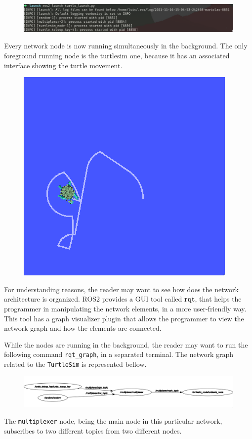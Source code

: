 \begin{figure}[H]
        \centering
         \includegraphics[width=0.7\linewidth]{images/ts_launch_ros.png}
\end{figure}

Every network node is now running simultaneously in the background. The only foreground running node is the turtlesim one, because it has an associated interface showing the turtle movement.

\begin{figure}[H]
        \centering
        \includegraphics[width=0.3\linewidth]{images/ts_turtle.png}
\end{figure}

For understanding reasons, the reader may want to see how does the network architecture is organized. ROS2 provides a GUI tool called \textbf{rqt}, that helps the programmer in manipulating the network elements, in a more user-friendly way. This tool has a graph visualizer plugin that allows the programmer to view the network graph and how the elements are connected.

While the nodes are running in the background, the reader may want to run the following command \texttt{rqt\_graph}, in a separated terminal. The network graph related to the \texttt{TurtleSim} is represented bellow.

\begin{figure}[H]
        \centering
         \includegraphics[width=\linewidth]{images/ts_rqt_graph.png}
\end{figure}

The \texttt{multiplexer} node, being the main node in this particular network, subscribes to two different topics from two different nodes.

